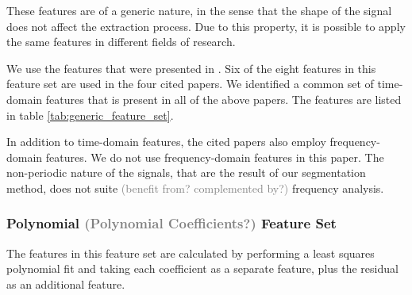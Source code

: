 \documentclass[conference]{IEEEtran}
\begin{document}
  These features are of a generic nature, in the sense that the shape of the signal does not affect the extraction process. Due to this property, it is possible to apply the same features in different fields of research.
  
  We use the features that were presented in \cite{kneib2018scission}. Six of the eight features in this feature set are used in the four cited papers.
  We identified a common set of time-domain features that is present in all of the above papers. The features are listed in table \ref{tab:generic_feature_set}.
  
  \begin{table}
    \caption{Generic Feature Set}
    \label{tab:generic_feature_set}
    \centering
  \end{table}
  
  In addition to time-domain features, the cited papers also employ frequency-domain features. We do not use frequency-domain features in this paper. The non-periodic nature of the signals, that are the result of our segmentation method, does not suite \textcolor{gray}{(benefit from? complemented by?)} frequency analysis.

\subsubsection{Polynomial \textcolor{gray}{(Polynomial Coefficients?)} Feature Set}
  The features in this feature set are calculated by performing a least squares polynomial fit and taking each coefficient as a separate feature, plus the residual as an additional feature.
  
\end{document}
